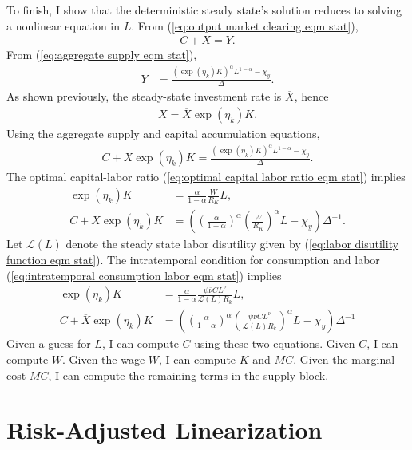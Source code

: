 \documentclass[12 pt, oneside]{article}
\theoremstyle{definition}
\theoremstyle{definition}
\theoremstyle{definition}
\newcommand{\calL}{\mathcal{L}}
\begin{document}
To finish, I show that the deterministic steady state's solution reduces to solving a nonlinear equation in $L$.
From (\ref{eq:output market clearing eqm stat}),
\begin{align*}
  C + X = Y.
\end{align*}
From (\ref{eq:aggregate supply eqm stat}),
\begin{align*}
  Y & = \frac{(\exp(\eta_k)K)^\alpha L^{1 - \alpha} - \chi_y}{\Delta}.
\end{align*}
As shown previously, the steady-state investment rate is $\overline{X}$, hence
\begin{align*}
  X = \overline{X}\exp(\eta_k)K.
\end{align*}
Using the aggregate supply and capital accumulation equations,
\begin{align*}
  C + \overline{X} \exp(\eta_k)K = \frac{(\exp(\eta_k)K)^\alpha L^{1 - \alpha} - \chi_y}{\Delta}.
\end{align*}
The optimal capital-labor ratio (\ref{eq:optimal capital labor ratio eqm stat}) implies
\begin{align*}
  \exp(\eta_k)K & = \frac{\alpha}{1 - \alpha}\frac{W}{R_K}L,\\
  C + \overline{X} \exp(\eta_k) K & = \left(\left(\frac{\alpha}{1 - \alpha}\right)^{\alpha} \left(\frac{W}{R_K}\right)^\alpha L - \chi_y\right)\Delta^{ - 1}.
\end{align*}
Let $\calL(L)$ denote the steady state labor disutility given by (\ref{eq:labor disutility function eqm stat}). The intratemporal condition for consumption and labor (\ref{eq:intratemporal consumption labor eqm stat}) implies
\begin{align*}
  \exp(\eta_k) K & = \frac{\alpha}{1 - \alpha}\frac{\psi \overline{\nu} C L^\nu }{ \calL(L) R_k} L ,\\
  C + \overline{X}\exp(\eta_k) K & = \left(\left(\frac{\alpha}{1 - \alpha}\right)^{\alpha} \left(\frac{\psi \overline{\nu} C L^\nu}{\calL(L)R_k }\right)^\alpha L - \chi_y\right)\Delta^{ - 1}
\end{align*}
Given a guess for $L$, I can compute $C$ using these two equations. Given $C$, I can compute $W$. Given the wage $W$, I can compute $K$ and $MC$. Given the marginal cost $MC$, I can compute the remaining terms in the supply block.

\section{Risk-Adjusted Linearization}\label{sec:ral}
\end{document}
